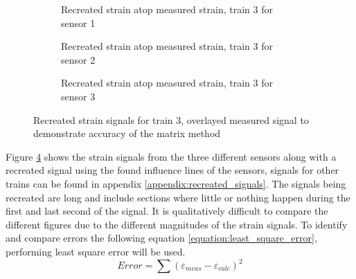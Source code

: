 \begin{figure}[p]
	\centering
	\begin{subfigure}[t]{0.9\textwidth}
		\begin{adjustbox}{center}
		
		\end{adjustbox}
		\caption{Recreated strain atop measured strain, train 3 for sensor 1}
		\label{recreated_sensor_middle_train3}
	\end{subfigure}
	\centering
	\begin{subfigure}[t]{0.9\textwidth}
		\begin{adjustbox}{center}
			
		\end{adjustbox}
		\caption{Recreated strain atop measured strain, train 3 for sensor 2 }
		\label{recreated_sensor_trond_train3}
	\end{subfigure}
	\centering
	\begin{subfigure}[t]{0.9\textwidth}
		\begin{adjustbox}{center}
			
		\end{adjustbox}
		\caption{Recreated strain atop measured strain, train 3 for sensor 3}
		\label{recreated_sensor_heimdal_train3}
	\end{subfigure}
	\caption{Recreated strain signals for train 3, overlayed measured signal to demonstrate accuracy of the matrix method}
	\label{fig:recreated_strains}
\end{figure}
Figure \ref{fig:recreated_strains} shows the strain signals from the three different sensors along with a recreated signal using the found influence lines of the sensors, signals for other trains can be found in appendix \ref{appendix:recreated_signals}. The signals being recreated are long and include sections where little or nothing happen during the first and last second of the signal. It is qualitatively difficult to compare the different figures due to the different magnitudes of the strain signals.
To identify and compare errors the following equation \ref{equation:least_square_error}, performing least square error will be used.
\begin{equation}
	Error = \sum{ (\varepsilon_{meas} - \varepsilon_{calc})^2}
	\label{equation:least_square_error}
\end{equation}
